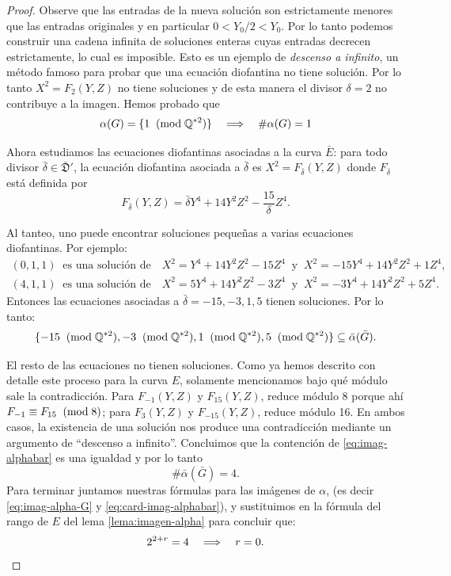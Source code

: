 \documentclass[../../tesis_maestria]{subfiles}
\begin{document}
\begin{proof}
Observe que las entradas de la nueva solución son estrictamente menores que las entradas originales y en particular $0<Y_0/2<Y_0$. Por lo tanto podemos construir una cadena infinita de soluciones enteras cuyas entradas decrecen estrictamente, lo cual es imposible. Esto es un ejemplo de \emph{descenso a infinito}, un método famoso para probar que una ecuación diofantina no tiene solución. Por lo tanto $X^2=F_2(Y,Z)$ no tiene soluciones y de esta manera el divisor $\delta=2$ no contribuye a la imagen. Hemos probado que
\begin{equation}\label{eq:imag-alpha-G}
	\alpha(G)=\{1\;\;(\mathrm{mod}\; \mathbb{Q}^{*2})\}\quad\Longrightarrow\quad \#\alpha(G)=1 
\end{equation}

Ahora estudiamos las ecuaciones diofantinas asociadas a la curva $\bar{E}$: para todo divisor $\bar{\delta}\in\bar{\mathfrak{D}}'$, la ecuación diofantina asociada a $\bar{\delta}$ es $X^2=F_{\bar{\delta}}(Y,Z)$ donde $F_{\bar{\delta}}$ está definida por
\[
	F_{\bar{\delta}}(Y,Z)=\bar{\delta}Y^4+14Y^2 Z^2-\frac{15}{\delta}Z^4.
\]

Al tanteo, uno puede encontrar soluciones pequeñas a varias ecuaciones diofantinas. Por ejemplo:
\begin{gather*}
	(0,1,1)\;\;\text{es una solución de}\quad X^2=Y^4+14 Y^2 Z^2-15Z^4\;\;\text{y}\;\; X^2=-15Y^4+14 Y^2 Z^2+1Z^4, \\
	(4,1,1)\;\;\text{es una solución de}\quad X^2=5Y^4+14 Y^2 Z^2-3Z^4\;\;\text{y}\;\; X^2=-3Y^4+14 Y^2 Z^2+5Z^4.
\end{gather*}
Entonces las ecuaciones asociadas a $\bar{\delta}=-15,-3,1,5$ tienen soluciones. Por lo tanto:
\begin{equation}\label{eq:imag-alphabar}
	\{-15\;\;(\mathrm{mod}\; \mathbb{Q}^{*2}),-3\;\;(\mathrm{mod}\; \mathbb{Q}^{*2}),1\;\;(\mathrm{mod}\; \mathbb{Q}^{*2}),5\;\;(\mathrm{mod}\; \mathbb{Q}^{*2})\}\subseteq\bar{\alpha}(\bar{G}).
\end{equation}



El resto de las ecuaciones no tienen soluciones. Como ya hemos descrito con detalle este proceso para la curva $E$, solamente mencionamos bajo qué módulo sale la contradicción. Para $F_{-1}(Y,Z)$ y $F_{15}(Y,Z)$, reduce módulo 8 porque ahí $F_{-1}\equiv F_{15}\;\;(\mathrm{mod}\; 8)$; para $F_3(Y,Z)$ y $F_{-15}(Y,Z)$, reduce módulo 16. En ambos casos, la existencia de una solución nos produce una contradicción mediante un argumento de ``descenso a infinito''. Concluimos que la contención de \eqref{eq:imag-alphabar} es una igualdad y por lo tanto
\begin{equation}\label{eq:card-imag-alphabar}
	\#\bar{\alpha}(\bar{G})=4.
\end{equation}
Para terminar juntamos nuestras fórmulas para las imágenes de $\alpha$, (es decir \eqref{eq:imag-alpha-G} y \eqref{eq:card-imag-alphabar}), y sustituimos en la fórmula del rango de $E$ del lema \ref{lema:imagen-alpha} para concluir que:
\[
	2^{2+r}=4\quad\Longrightarrow\quad r=0.
\]
\end{proof}
\end{document}
